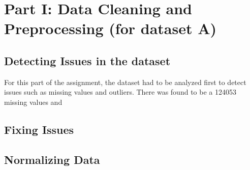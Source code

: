 \section{Part I: Data Cleaning and Preprocessing (for dataset A)}
\subsection{Detecting Issues in the dataset}
For this part of the assignment, the dataset had to be analyzed first to detect issues such as missing values and outliers. There was found to be a 124053 missing values and 


\subsection{Fixing Issues}




\subsection{Normalizing Data}
